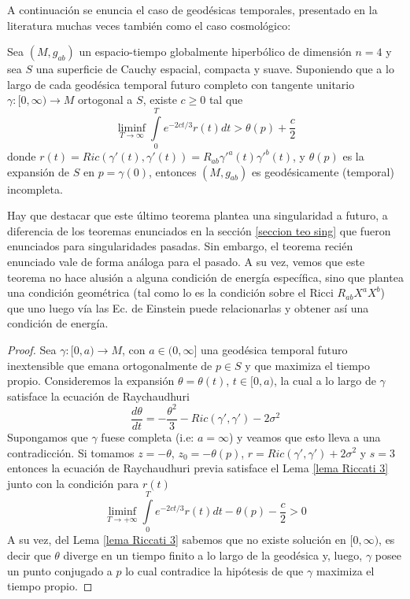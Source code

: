 A continuación se enuncia el caso de geodésicas temporales, presentado en la literatura muchas veces también como el caso cosmológico:

\begin{theorem}\label{teo sing gral cosmo}
Sea $(M,g_{ab})$ un espacio-tiempo globalmente hiperbólico de dimensión $n=4$ y sea $S$ una superficie de Cauchy espacial, compacta y suave. Suponiendo que a lo largo de cada geodésica temporal futuro completo con tangente unitario $\gamma:[0,\infty)\rightarrow M$ ortogonal a $S$, existe $c\geq 0$ tal que 
$$
\liminf_{T\to \infty}\int\limits_0^T e^{-2ct/3}r(t)dt > \theta(p)+\frac{c}{2}
$$
donde $r(t)=Ric(\gamma'(t),\gamma'(t))=R_{ab}\gamma'^a(t)\gamma'^b(t)$, y $\theta(p)$ es la expansión de $S$ en $p=\gamma(0)$, entonces $(M,g_{ab})$ es geodésicamente (temporal) incompleta.
\end{theorem}


Hay que destacar que este último teorema plantea una singularidad a futuro, a diferencia de los teoremas enunciados en la sección \ref{seccion teo sing} que fueron enunciados para singularidades pasadas. Sin embargo, el teorema recién enunciado vale de forma análoga para el pasado. A su vez, vemos que este teorema no hace alusión a alguna condición de energía específica, sino que plantea una condición geométrica (tal como lo es la condición sobre el Ricci $R_{ab}X^aX^b$) que uno luego vía las Ec. de Einstein puede relacionarlas y obtener así una condición de energía. 

\begin{proof}
Sea $\gamma:[0,a)\rightarrow M$, con $a\in (0,\infty]$ una geodésica temporal futuro inextensible que emana ortogonalmente de $p\in S$ y que maximiza el tiempo propio. Consideremos la expansión $\theta=\theta(t)$, $t\in [0,a)$, la cual a lo largo de $\gamma$ satisface la ecuación de Raychaudhuri
$$
\frac{d\theta}{dt}=-\frac{\theta^2}{3}-Ric(\gamma',\gamma')-2\sigma^2
$$
Supongamos que $\gamma$ fuese completa (i.e: $a=\infty$) y veamos que esto lleva a una contradicción. Si tomamos $z=-\theta$, $z_0=-\theta(p)$, $r=Ric(\gamma',\gamma')+2\sigma^2$ y $s=3$ entonces la ecuación de Raychaudhuri previa satisface el Lema \ref{lema Riccati 3} junto con la condición para $r(t)$
$$
\liminf_{T\to +\infty}\int\limits_0^T e^{-2ct/3}r(t)dt - \theta(p) - \frac{c}{2}>0
$$
A su vez, del Lema \ref{lema Riccati 3} sabemos que no existe solución en $[0,\infty)$, es decir que $\theta$ diverge en un tiempo finito a lo largo de la geodésica y, luego, $\gamma$ posee un punto conjugado a $p$ lo cual contradice la hipótesis de que $\gamma$ maximiza el tiempo propio.
\end{proof}


